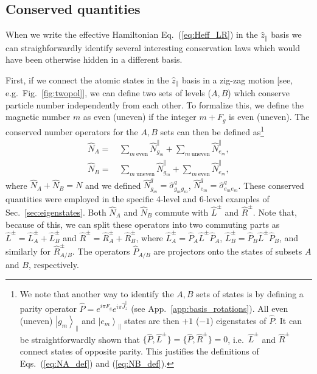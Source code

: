 \documentclass[aps,prx,superscriptaddress,twocolumn,notitlepage,nofootinbib,longbibliography]{revtex4-2}
\newcommand{\ket}[1]{\left|#1\right>}
\newcommand{\quv}{\hat{z}}
\newcommand{\qusub}{q}
\begin{document}

\subsection{Conserved quantities\label{app:eigenstates_conservedQ}}

When we write the effective Hamiltonian Eq.~(\ref{eq:Heff_LR}) in the $\quv_\parallel$ basis we can straighforwardly identify several interesting conservation laws which would have been otherwise hidden in a different basis.

First, if we connect the atomic states in the $\quv_\parallel$ basis in a zig-zag motion [see, e.g.~Fig.~\ref{fig:twopol}], we can define two sets of levels ($A,B$) which conserve particle number independently from each other. 
To formalize this, we define the magnetic number $m$ as even (uneven) if the integer $m+F_g$ is even (uneven). The conserved number operators for the $A,B$ sets can then be defined as\footnote{We note that another way to identify the $A,B$ sets of states is by defining a parity operator $\hat{P} = e^{i\pi F_g} e^{i\pi \hat{J}^\parallel_z}$ (see App.~\ref{app:basis_rotations}).
All even (uneven) $\ket{g_m}_\parallel$ and $\ket{e_m}_\parallel$ states are then $+1$ ($-1$) eigenstates of $\hat{P}$. It can be straightforwardly shown that $\{ \hat{P}, \hat{L}^\pm \} = \{ \hat{P}, \hat{R}^\pm \} = 0$, i.e.~$\hat{L}^\pm$ and $\hat{R}^\pm$ connect states of opposite parity. This justifies the definitions of Eqs.~(\ref{eq:NA_def}) and (\ref{eq:NB_def}).}
\begin{align}
	\hat{N}_A =&\, \sum_{m\ \text{even}} \hat{N}^\parallel_{g_m} + \sum_{m\ \text{uneven}} \hat{N}^\parallel_{e_m},
\label{eq:NA_def} \\
	\hat{N}_B =&\, \sum_{m\ \text{uneven}} \hat{N}^\parallel_{g_m} + \sum_{m\ \text{even}} \hat{N}^\parallel_{e_m},
\label{eq:NB_def}
\end{align}
where $\hat{N}_A+\hat{N}_B = N$ and we defined $\hat{N}^{\qusub}_{g_m}=\hat{\sigma}^{\qusub}_{g_mg_m}$, $\hat{N}^{\qusub}_{e_m}=\hat{\sigma}^{\qusub}_{e_me_m}$. These conserved quantities were employed in the specific 4-level and 6-level examples of Sec.~\ref{sec:eigenstates}. Both $\hat{N}_A$ and $\hat{N}_B$ commute with $\hat{L}^\pm$ and $\hat{R}^\pm$.
Note that, because of this, we can split these operators into two commuting parts as $\hat{L}^\pm=\hat{L}^\pm_A+\hat{L}^\pm_B$ and $\hat{R}^\pm=\hat{R}^\pm_A+\hat{R}^\pm_B$, where $\hat{L}^\pm_A = \hat{P}_A \hat{L}^\pm \hat{P}_A $, $\hat{L}^\pm_B = \hat{P}_B \hat{L}^\pm \hat{P}_B $, and similarly for $\hat{R}^\pm_{A/B}$. The operators $\hat{P}_{A/B}$ are projectors onto the states of subsets $A$ and $B$, respectively.
\end{document}

